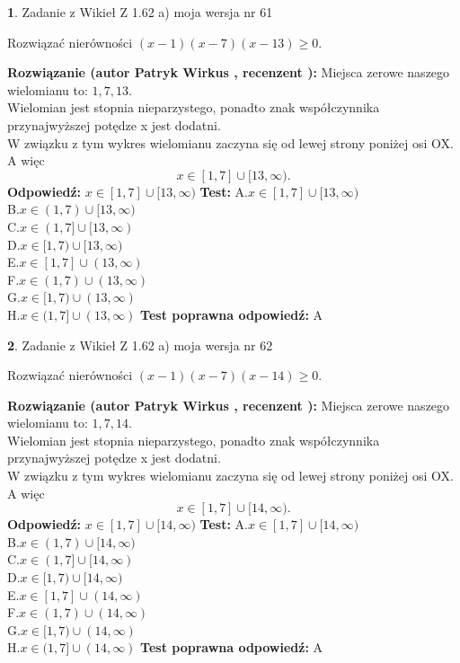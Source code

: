 \documentclass[12pt, a4paper]{article}
\theoremstyle{definition} %
\newtheorem{zad}{}
\newcommand{\zadStart}[1]{\begin{zad}#1\newline}
\newcommand{\zadStop}{\end{zad}}
\newcommand{\rozwStart}[2]{\noindent \textbf{Rozwiązanie (autor #1 , recenzent #2): }\newline}
\newcommand{\rozwStop}{\newline}
\newcommand{\odpStart}{\noindent \textbf{Odpowiedź:}\newline}
\newcommand{\odpStop}{\newline}
\newcommand{\testStart}{\noindent \textbf{Test:}\newline}
\newcommand{\testStop}{\newline}
\newcommand{\kluczStart}{\noindent \textbf{Test poprawna odpowiedź:}\newline}
\newcommand{\kluczStop}{\newline}
\begin{document}
\zadStart{Zadanie z Wikieł Z 1.62 a) moja wersja nr 61}

Rozwiązać nierówności $(x-1)(x-7)(x-13)\ge0$.
\zadStop
\rozwStart{Patryk Wirkus}{}
Miejsca zerowe naszego wielomianu to: $1, 7, 13$.\\
Wielomian jest stopnia nieparzystego, ponadto znak współczynnika przy\linebreak najwyższej potędze x jest dodatni.\\ W związku z tym wykres wielomianu zaczyna się od lewej strony poniżej osi OX. A więc $$x \in [1,7] \cup [13,\infty).$$
\rozwStop
\odpStart
$x \in [1,7] \cup [13,\infty)$
\odpStop
\testStart
A.$x \in [1,7] \cup [13,\infty)$\\
B.$x \in (1,7) \cup [13,\infty)$\\
C.$x \in (1,7] \cup [13,\infty)$\\
D.$x \in [1,7) \cup [13,\infty)$\\
E.$x \in [1,7] \cup (13,\infty)$\\
F.$x \in (1,7) \cup (13,\infty)$\\
G.$x \in [1,7) \cup (13,\infty)$\\
H.$x \in (1,7] \cup (13,\infty)$
\testStop
\kluczStart
A
\kluczStop



\zadStart{Zadanie z Wikieł Z 1.62 a) moja wersja nr 62}

Rozwiązać nierówności $(x-1)(x-7)(x-14)\ge0$.
\zadStop
\rozwStart{Patryk Wirkus}{}
Miejsca zerowe naszego wielomianu to: $1, 7, 14$.\\
Wielomian jest stopnia nieparzystego, ponadto znak współczynnika przy\linebreak najwyższej potędze x jest dodatni.\\ W związku z tym wykres wielomianu zaczyna się od lewej strony poniżej osi OX. A więc $$x \in [1,7] \cup [14,\infty).$$
\rozwStop
\odpStart
$x \in [1,7] \cup [14,\infty)$
\odpStop
\testStart
A.$x \in [1,7] \cup [14,\infty)$\\
B.$x \in (1,7) \cup [14,\infty)$\\
C.$x \in (1,7] \cup [14,\infty)$\\
D.$x \in [1,7) \cup [14,\infty)$\\
E.$x \in [1,7] \cup (14,\infty)$\\
F.$x \in (1,7) \cup (14,\infty)$\\
G.$x \in [1,7) \cup (14,\infty)$\\
H.$x \in (1,7] \cup (14,\infty)$
\testStop
\kluczStart
A
\kluczStop
\end{document}
